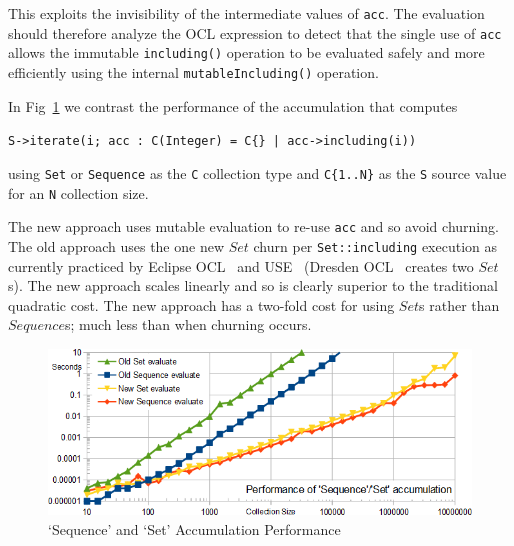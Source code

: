 \documentclass{llncs}
\begin{document}
This exploits the invisibility of the intermediate values of \verb$acc$. The evaluation should therefore analyze the OCL expression to detect that the single use of \verb$acc$ allows the immutable \verb$including()$ operation to be evaluated safely and more efficiently using the internal \verb$mutableIncluding()$ operation. 

In Fig~\ref{fig:AccumulationPerformance} we contrast the performance of the accumulation that computes 

\verb$S->iterate(i; acc : C(Integer) = C{} | acc->including(i))$

using \verb$Set$ or \verb$Sequence$ as the \verb$C$ collection type and \verb$C{1..N}$ as the \verb$S$ source value for an \verb$N$ collection size.

The new approach uses mutable evaluation to re-use \verb$acc$ and so avoid churning.
The old approach uses the one new $Set$ churn per \verb$Set::including$ execution as currently practiced by Eclipse OCL~\cite{Eclipse-OCL} and USE~\cite{USE} (Dresden OCL~\cite{Dresden-OCL} creates two $Set$s). The new approach scales linearly and so is clearly superior to the traditional quadratic cost. The new approach has a two-fold cost for using $Set$s rather than $Sequence$s; much less than when churning occurs.

\begin{figure}
	\begin{center}
		\includegraphics[width=4.5in]{AccumulationPerformance.png}
	\end{center}
	\caption{`Sequence' and `Set' Accumulation Performance}
	\label{fig:AccumulationPerformance}
\end{figure}

\end{document}

